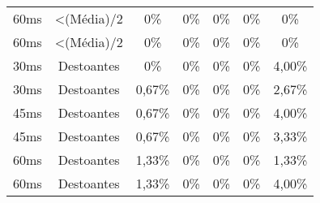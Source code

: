 \begin{table}[]
\begin{tabular}{|c|c|ccccc|}
60ms              & \textless (Média)/2 & 0\%            & 0\%            & 0\%            & 0\%            & 0\%            \\
60ms              & \textless (Média)/2 & 0\%            & 0\%            & 0\%            & 0\%            & 0\%            \\ \hline
30ms              & Destoantes          & 0\%            & 0\%            & 0\%            & 0\%            & 4,00\%            \\
30ms              & Destoantes          & 0,67\%            & 0\%            & 0\%            & 0\%            & 2,67\%            \\
45ms              & Destoantes          & 0,67\%            & 0\%            & 0\%            & 0\%            & 4,00\%            \\
45ms              & Destoantes          & 0,67\%            & 0\%            & 0\%            & 0\%            & 3,33\%            \\
60ms              & Destoantes          & 1,33\%            & 0\%            & 0\%            & 0\%            & 1,33\%            \\
60ms              & Destoantes          & 1,33\%            & 0\%            & 0\%            & 0\%            & 4,00\%            \\ \hline
\end{tabular}
\end{table}

